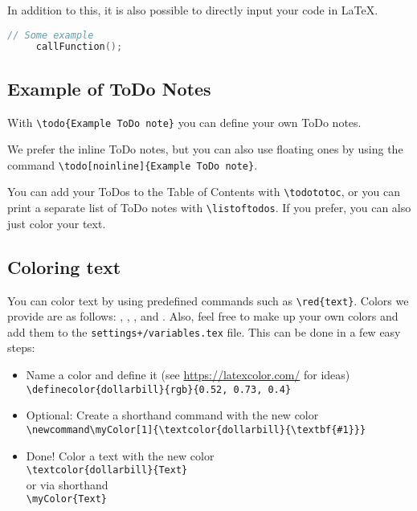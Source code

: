 \documentclass[class=scrbook, crop=false]{standalone}
\begin{document}
    In addition to this, it is also possible to directly input your code in \LaTeX.
    \begin{lstlisting}[language=C++,
                       caption=Another Descriptive Caption Text,
                       label=Code:Super Code2]
     // Some example
     callFunction();
    \end{lstlisting}

    \subsection{Example of ToDo Notes}
    \label{Section::ToDo}
    With \verb|\todo{Example ToDo note}| you can define your own ToDo notes.

    We prefer the inline ToDo notes, but you can also use floating ones by using the command \verb|\todo[noinline]{Example ToDo note}|.

    You can add your ToDos to the Table of Contents with \verb|\todototoc|, or you can print a separate list of ToDo notes with \verb|\listoftodos|.
    If you prefer, you can also just color your text.

    \subsection{Coloring text}
    \label{Section::Colors}
    You can color text by using predefined commands such as \verb|\red{text}|.
    Colors we provide are as follows: , , , and . Also, feel free to make up your own colors and add them to the \verb|settings+/variables.tex| file. This can be done in a few easy steps:
    \begin{itemize}
        \item Name a color and define it (see \url{https://latexcolor.com/} for ideas)\\
              \verb|\definecolor{dollarbill}{rgb}{0.52, 0.73, 0.4}|
        \item Optional: Create a shorthand command with the new color\\
              \verb|\newcommand\myColor[1]{\textcolor{dollarbill}{\textbf{#1}}}|
        \item Done! Color a text with the new color\\
              \verb|\textcolor{dollarbill}{Text}|\\
              or via shorthand\\
              \verb|\myColor{Text}|
    \end{itemize}
\end{document}
